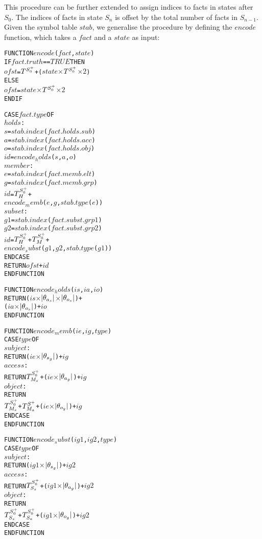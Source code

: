 \documentclass[10pt, twocolumn]{article}
\begin{document}
          This procedure can be further extended to assign indices to facts in
          states after $S_{0}$. The indices of facts in state $S_{n}$ is offset
          by the total number of facts in $S_{n - 1}$. Given the symbol table
          $stab$, we generalise the procedure by defining the $encode$
          function, which takes a $fact$ and a $state$ as input:

          \begin{alltt}
FUNCTION \(encode\)(\(fact\), \(state\))
  IF \(fact.truth\) == \(TRUE\) THEN
    \(ofst\) = \(T\sp{S\sp{+}\sb{0}}\) + (\(state\) \(\times\) \(T\sp{S\sp{+}\sb{0}}\) \(\times\) \(2\))
  ELSE
    \(ofst\) = \(state\) \(\times\) \(T\sp{S\sp{+}\sb{0}}\) \(\times\) \(2\)
  ENDIF

  CASE \(fact.type\) OF
    \(holds\) :
      \(s\) = \(stab.index\)(\(fact.holds.sub\))
      \(a\) = \(stab.index\)(\(fact.holds.acc\))
      \(o\) = \(stab.index\)(\(fact.holds.obj\))
      \(id\) = \(encode_holds\)(\(s\), \(a\), \(o\))
    \(member\) :
      \(e\) = \(stab.index\)(\(fact.memb.elt\))
      \(g\) = \(stab.index\)(\(fact.memb.grp\))
      \(id\) = \(T\sp{S\sp{+}\sb{0}}\sb{H}\) +
          \(encode_memb\)(\(e\), \(g\), \(stab.type\)(\(e\)))
    \(subset\) :
      \(g1\) = \(stab.index\)(\(fact.subst.grp1\))
      \(g2\) = \(stab.index\)(\(fact.subst.grp2\))
      \(id\) = \(T\sp{S\sp{+}\sb{0}}\sb{H}\) + \(T\sp{S\sp{+}\sb{0}}\sb{M}\) +
          \(encode_subst\)(\(g1\), \(g2\), \(stab.type\)(\(g1\)))
  ENDCASE
  RETURN \(ofst\) + \(id\)
ENDFUNCTION

FUNCTION \(encode_holds\)(\(is\), \(ia\), \(io\))
  RETURN (\(is\) \(\times\) \(|{\theta}\sb{a\sb{s}}|\) \(\times\) \(|{\theta}\sb{o\sb{s}}|\)) +
         (\(ia\) \(\times\) \(|{\theta}\sb{o\sb{s}}|\)) + \(io\)
ENDFUNCTION

FUNCTION \(encode_memb\)(\(ie\), \(ig\), \(type\))
  CASE \(type\) OF
    \(subject\) :
      RETURN (\(ie\) \(\times\) \(|{\theta}\sb{s\sb{g}}|\)) + \(ig\)
    \(access\) : 
      RETURN \(T\sp{S\sp{+}\sb{0}}\sb{M\sb{s}}\) + (\(ie\) \(\times\) \(|{\theta}\sb{a\sb{g}}|\)) + \(ig\)
    \(object\) :
      RETURN
        \(T\sp{S\sp{+}\sb{0}}\sb{M\sb{s}}\) + \(T\sp{S\sp{+}}\sb{M\sb{a}}\) + (\(ie\) \(\times\) \(|{\theta}\sb{o\sb{g}}|\)) + \(ig\)
  ENDCASE
ENDFUNCTION

FUNCTION \(encode_subst\)(\(ig1\), \(ig2\), \(type\))
  CASE \(type\) OF
    \(subject\) :
      RETURN (\(ig1\) \(\times\) \(|{\theta}\sb{s\sb{g}}|\)) + \(ig2\)
    \(access\) :
      RETURN \(T\sp{S\sp{+}\sb{0}}\sb{S\sb{s}}\) + (\(ig1\) \(\times\) \(|{\theta}\sb{a\sb{g}}|\)) + \(ig2\)
    \(object\) :
      RETURN
        \(T\sp{S\sp{+}\sb{0}}\sb{S\sb{s}}\) + \(T\sp{S\sp{+}\sb{0}}\sb{S\sb{a}}\) + (\(ig1\) \(\times\) \(|{\theta}\sb{o\sb{g}}|\)) + \(ig2\)
  ENDCASE
ENDFUNCTION
          \end{alltt}
\end{document}
